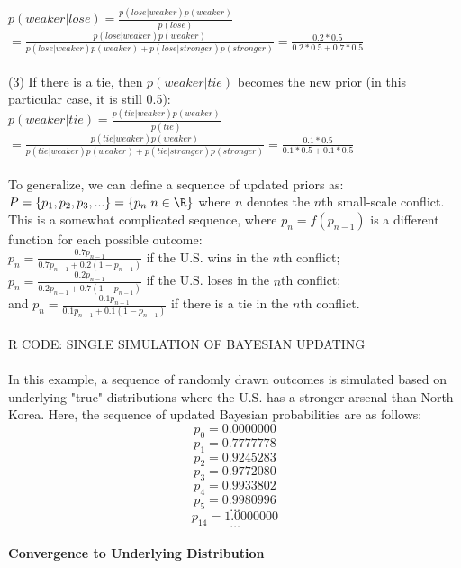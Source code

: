 \documentclass[12pt]{article}
\begin{document}
\begin{itemize}
$p(weaker | lose)= \frac{p(lose | weaker) p(weaker)}{p(lose)}$\\
$= \frac{p(lose | weaker) p(weaker)}{p(lose|weaker)p(weaker)+p(lose|stronger)p(stronger)} = \frac{0.2*0.5}{0.2*0.5+0.7*0.5}$\\
\\
(3) If there is a tie, then $p(weaker | tie)$ becomes the new prior (in this particular case, it is still 0.5):\\
$p(weaker | tie)= \frac{p(tie | weaker) p(weaker)}{p(tie)}$\\
$= \frac{p(tie | weaker) p(weaker)}{p(tie|weaker)p(weaker)+p(tie|stronger)p(stronger)} = \frac{0.1*0.5}{0.1*0.5+0.1*0.5}$\\
\\
To generalize, we can define a sequence of updated priors as:\\
$P= \left\{ p_1, p_2, p_3, ... \right\} = \left\{ p_n | n \in \R \right\}$ where $n$ denotes the $n$th small-scale conflict.\\
This is a somewhat complicated sequence, where $p_n=f(p_{n-1})$ is a different function for each possible outcome:\\
$p_n=\frac{0.7p_{n-1}}{0.7p_{n-1}+0.2(1-p_{n-1})}$ if the U.S. wins in the $n$th conflict;\\
$p_n=\frac{0.2p_{n-1}}{0.2p_{n-1}+0.7(1-p_{n-1})}$ if the U.S. loses in the $n$th conflict;\\
and $p_n=\frac{0.1p_{n-1}}{0.1p_{n-1}+0.1(1-p_{n-1})}$ if there is a tie in the $n$th conflict.\\
\\
R CODE: SINGLE SIMULATION OF BAYESIAN UPDATING\\
\\
In this example, a sequence of randomly drawn outcomes is simulated based on underlying "true" distributions where the U.S. has a stronger arsenal than North Korea. Here, the sequence of updated Bayesian probabilities are as follows:\\
$$p_0=0.0000000$$
$$p_1=0.7777778$$
$$p_2=0.9245283$$
$$p_3=0.9772080$$
$$p_4=0.9933802$$
$$p_5=0.9980996$$
$$\dots$$
$$p_{14}=1.0000000$$
$$\dots$$
\end{itemize}

\paragraph*{Convergence to Underlying Distribution}
\end{document}
